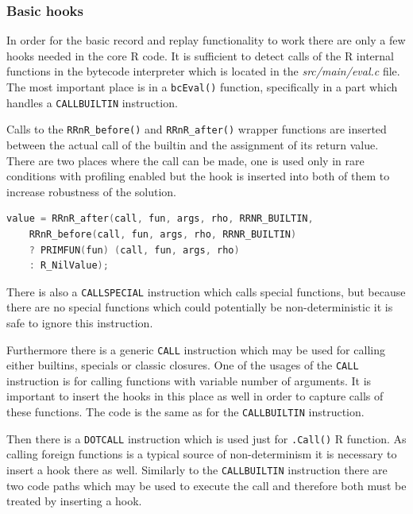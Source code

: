 \documentclass[thesis=M,english,hidelinks]{FITthesis}[2012/10/20]
\begin{document}
			\subsubsection{Basic hooks}
			In order for the basic record and replay functionality to work there are only a few hooks needed in the core R code. It is sufficient to detect calls of the R internal functions in the bytecode interpreter which is located in the \emph{src/main/eval.c} file. The most important place is in a \lstinline|bcEval()| function, specifically in a part which handles a \lstinline|CALLBUILTIN| instruction.\par
			
			Calls to the \lstinline|RRnR_before()| and \lstinline|RRnR_after()| wrapper functions are inserted between the actual call of the builtin and the assignment of its return value. There are two places where the call can be made, one is used only in rare conditions with profiling enabled but the hook is inserted into both of them to increase robustness of the solution.\par
			
\begin{lstlisting}[style=filestyle, language=C, caption={The \emph{CALLBUILTIN} instruction hook}]
value = RRnR_after(call, fun, args, rho, RRNR_BUILTIN,
	RRnR_before(call, fun, args, rho, RRNR_BUILTIN)
	? PRIMFUN(fun) (call, fun, args, rho)
	: R_NilValue);
\end{lstlisting}
			
			There is also a \lstinline|CALLSPECIAL| instruction which calls special functions, but because there are no special functions which could potentially be non-deterministic it is safe to ignore this instruction.\par
			
			Furthermore there is a generic \lstinline|CALL| instruction which may be used for calling either builtins, specials or classic closures. One of the usages of the \lstinline|CALL| instruction is for calling functions with variable number of arguments. It is important to insert the hooks in this place as well in order to capture calls of these functions. The code is the same as for the \lstinline|CALLBUILTIN| instruction.\par
			
			Then there is a \lstinline|DOTCALL| instruction which is used just for \lstinline|.Call()| R function. As calling foreign functions is a typical source of non-determinism it is necessary to insert a hook there as well. Similarly to the \lstinline|CALLBUILTIN| instruction there are two code paths which may be used to execute the call and therefore both must be treated by inserting a hook.\par
		
\end{document}
